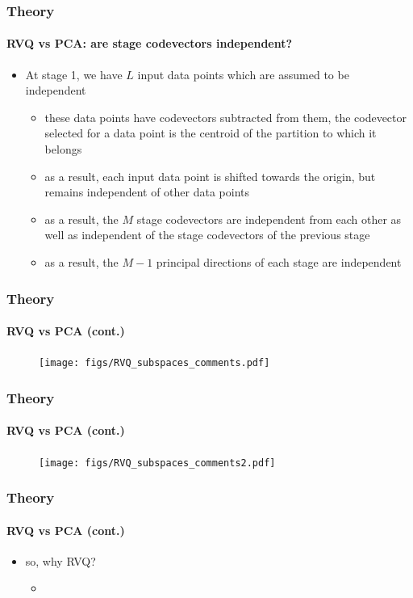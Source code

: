 \begin{frame}
\frametitle{Theory}
\framesubtitle{RVQ vs PCA: are stage codevectors independent?}
\mypagenum
	\begin{itemize}
		\item At stage 1, we have $L$ input data points which are assumed to be independent
			\begin{itemize}
				\item these data points have codevectors subtracted from them, the codevector selected for a data point is the centroid of the partition to which it belongs
				\item as a result, each input data point is shifted towards the origin, but remains independent of other data points
				\item as a result, the $M$ stage codevectors are independent from each other as well as independent of the stage codevectors of the previous stage
				\item as a result, the $M-1$ principal directions of each stage are independent
			\end{itemize}
	\end{itemize}	
\end{frame}



\begin{frame}[plain]
\frametitle{Theory}
\framesubtitle{RVQ vs PCA (cont.)}
\mypagenum
	\begin{changemargin}{-1.4in}{0in}
		\begin{figure}
			\texttt{[image: figs/RVQ\_subspaces\_comments.pdf]}
		\end{figure}	
	\end{changemargin}
\end{frame}


\begin{frame}[plain]
\frametitle{Theory}
\framesubtitle{RVQ vs PCA (cont.)}
\mypagenum
	\begin{changemargin}{-1.4in}{0in}
		\begin{figure}
			\texttt{[image: figs/RVQ\_subspaces\_comments2.pdf]}
		\end{figure}	
	\end{changemargin}
\end{frame}




\begin{frame}
\frametitle{Theory}
\framesubtitle{RVQ vs PCA (cont.)}
\mypagenum
	\begin{itemize}
		\item so, why RVQ?
			\begin{itemize}
				\item 
			\end{itemize}
	\end{itemize}
\end{frame}


